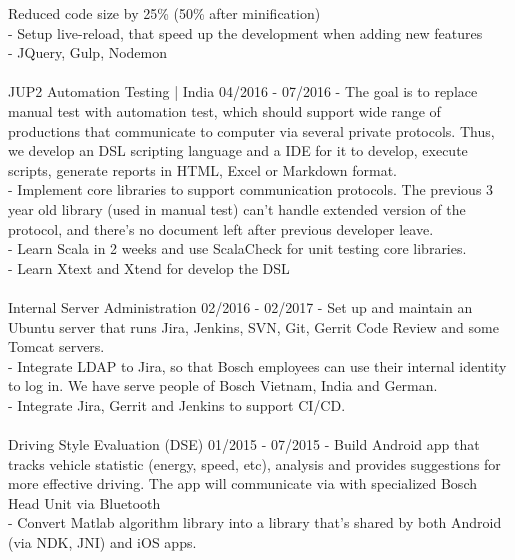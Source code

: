 {{    Reduced code size by 25\% (50\% after minification)\\
    - Setup live-reload,  that speed up the development when adding new
    features\\
    - JQuery, Gulp, Nodemon
  }
  \\
  \\
  \event
  {JUP2 Automation Testing | India}
  {04/2016 - 07/2016}
  {
    - The goal is to replace manual test with automation test, which should
    support wide range of productions that communicate to computer via several
    private protocols. Thus, we develop an DSL scripting language and a IDE for
    it to develop, execute scripts, generate reports in HTML, Excel or Markdown
    format.
    \\
    - Implement core libraries to support communication protocols. The previous
    3 year old library (used in manual test) can't  handle extended version of
    the protocol, and there's no document left  after previous developer leave.
    \\
    - Learn Scala in 2 weeks and use ScalaCheck for unit testing core libraries.\\
    - Learn Xtext and Xtend for develop the DSL
  }
  \\
  \\
  \event
  {Internal Server Administration}
  {02/2016 - 02/2017}
  {
    - Set up and maintain an Ubuntu server that runs Jira, Jenkins,
    SVN, Git, Gerrit Code Review and some Tomcat servers.\\
    - Integrate LDAP to Jira, so that Bosch employees can use their internal
    identity to log in. We have serve people of Bosch Vietnam, India and
    German. \\
    - Integrate Jira, Gerrit and Jenkins to support CI/CD.
  }
  \\
  \\
  \event
  {Driving Style Evaluation (DSE)}
  {01/2015 - 07/2015}
  {
    - Build Android app that tracks vehicle statistic (energy, speed, etc),
    analysis and provides suggestions for more effective driving. The app will
    communicate via with specialized Bosch Head Unit via Bluetooth
    \\
    - Convert Matlab algorithm library into a \cpp{} library that's shared
    by both Android (via NDK, JNI) and iOS apps.
  }
}
